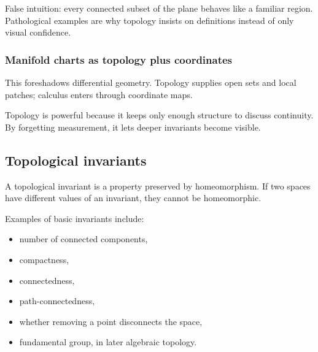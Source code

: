 \begin{trapbox}
False intuition: every connected subset of the plane behaves like a familiar
region. Pathological examples are why topology insists on definitions instead
of only visual confidence.
\end{trapbox}

\subsubsection*{Manifold charts as topology plus coordinates}

\begin{center}
\end{center}

This foreshadows differential geometry. Topology supplies open sets and local
patches; calculus enters through coordinate maps.

\begin{aestheticbox}
Topology is powerful because it keeps only enough structure to discuss
continuity. By forgetting measurement, it lets deeper invariants become visible.
\end{aestheticbox}

\subsection{Topological invariants}

A topological invariant is a property preserved by homeomorphism. If two spaces
have different values of an invariant, they cannot be homeomorphic.

Examples of basic invariants include:

\begin{itemize}
\item number of connected components,
\item compactness,
\item connectedness,
\item path-connectedness,
\item whether removing a point disconnects the space,
\item fundamental group, in later algebraic topology.
\end{itemize}


